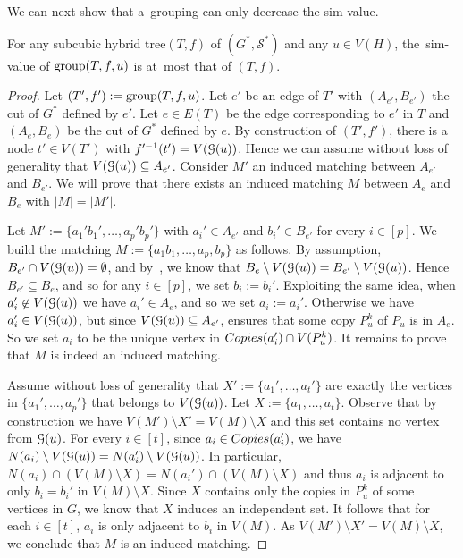 \documentclass[a4paper,UKenglish,cleveref,hyperref,autoref]{lipics-v2021}
\newcommand{\htree}{hybrid tree\xspace}
\begin{document}
We can next show that a~grouping can only decrease the sim-value. 

\begin{lemma}\label{lem:dec-sim-value}
For any subcubic \htree $(T, f)$ of $(G^*, \mathcal S^*)$ and any $u \in V(H)$, the~sim-value of $\text{group}(T, f, u)$ is at~most that of $(T, f)$.
\end{lemma}
\begin{proof}
Let $(T', f') := \text{group}(T, f, u)$.
Let $e'$ be an edge of $T'$ with $(A_{e'}, B_{e'})$ the cut of $G^*$ defined by $e'$.
Let $e \in E(T)$ be the edge corresponding to $e'$ in $T$ and $(A_e, B_e)$ be the cut of $G^*$ defined by $e$.
By construction of $(T', f')$, there is a node $t' \in V(T')$ with $f'^{-1}(t') = V(\mathcal G(u))$.
Hence we can assume without loss of generality that $V(\mathcal G(u)) \subseteq A_{e'}$.
Consider $M'$ an induced matching between $A_{e'}$ and $B_{e'}$.
We will prove that there exists an induced matching $M$ between $A_e$ and $B_e$ with $|M| = |M'|$.

Let $M' := \{a_1'b_1', \dots, a_p' b_p'\}$ with $a_i' \in A_{e'}$ and $b_i' \in B_{e'}$ for every $i \in [p]$.
We build the matching $M := \{a_1b_1, \dots, a_p, b_p\}$ as follows.
By assumption, $B_{e'} \cap V(\mathcal G(u)) = \emptyset$, and by~, we know that $B_e \setminus V(\mathcal G(u)) = B_{e'} \setminus V(\mathcal G(u))$.
Hence $B_{e'} \subseteq B_e$, and so for any $i \in [p]$, we set $b_i := b_i'$.	
Exploiting the same idea, when $a_i' \not \in V(\mathcal G(u))$ we have $a_i' \in A_e$, and so we set $a_i := a_i'$.
Otherwise we have $a_i' \in V(\mathcal G(u))$, but since $V(\mathcal G(u)) \subseteq A_{e'}$,  ensures that some copy $P_u^k$ of $P_u$ is in $A_e$.
So we set $a_i$ to be the unique vertex in $\copies(a_i') \cap V(P_u^k)$.
It remains to prove that $M$ is indeed an induced matching.

Assume without loss of generality that $X' := \{a_1',\dots,a_t'\}$ are exactly the vertices in $\{a_1',\dots,a_p'\}$ that belongs to $V(\mathcal G(u))$.
Let $X := \{a_1,\dots, a_t \}$.
Observe that by construction we have $V(M')\setminus X' = V(M) \setminus X$ and this set contains no vertex from $\mathcal G(u)$.
For every $i\in [t]$, since $a_i \in \copies(a_i')$, we have $N(a_i) \setminus V(\mathcal G(u)) = N(a_i') \setminus V(\mathcal G(u))$.
In particular, $N(a_i) \cap (V(M)\setminus X) = N(a_i')\cap (V(M)\setminus X)$ and thus $a_i$ is adjacent to only $b_i=b_i'$ in $V(M)\setminus X$.
Since $X$ contains only the copies in $P_u^k$ of some vertices in $G$, we know that $X$ induces an independent set.
It follows that for each $i\in [t]$, $a_i$ is only adjacent to $b_i$ in $V(M)$.
As $V(M')\setminus X' = V(M) \setminus X$, we conclude that $M$ is an induced matching.


\end{proof}
\end{document}
